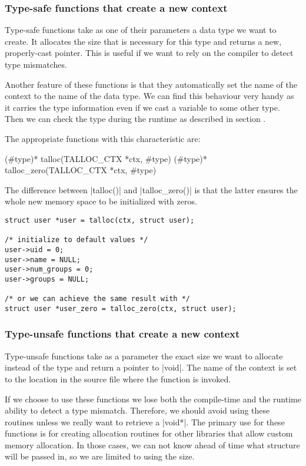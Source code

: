 \subsubsection{Type-safe functions that create a new context}

Type-safe functions take as one of their parameters a data type we want to
create. It allocates the size that is necessary for this type and returns a
new, properly-cast pointer. This is useful if we want to rely on the compiler
to detect type mismatches.

Another feature of these functions is that they automatically set the name of
the context to the name of the data type. We can find this behaviour very handy
as it carries the type information even if we cast a variable to some other
type. Then we can check the type during the runtime as described in section
.

The appropriate functions with this characteristic are:

\begin{funcproto}
(#type)* talloc(TALLOC_CTX *ctx, #type)
(#type)* talloc_zero(TALLOC_CTX *ctx, #type)
\end{funcproto}
\funclistend
The difference between |talloc()| and |talloc_zero()| is that the latter ensures
the whole new memory space to be initialized with zeros.

\begin{lstlisting}[caption={talloc() and talloc_zero()},label=lst:talloc_zero]
struct user *user = talloc(ctx, struct user);

/* initialize to default values */
user->uid = 0;
user->name = NULL;
user->num_groups = 0;
user->groups = NULL;

/* or we can achieve the same result with */
struct user *user_zero = talloc_zero(ctx, struct user);
\end{lstlisting}

\subsubsection{Type-unsafe functions that create a new context}

Type-unsafe functions take as a parameter the exact size we want to allocate
instead of the type and return a pointer to |void|. The name of the context
is set to the location in the source file where the function is invoked.

If we choose to use these functions we lose both the compile-time and the
runtime ability to detect a type mismatch. Therefore, we should avoid using
these routines unless we really want to retrieve a |void*|. The primary use for
these functions is for creating allocation routines for other libraries that
allow custom memory allocation. In those cases, we can not know ahead of time
what structure will be passed in, so we are limited to using the size.

